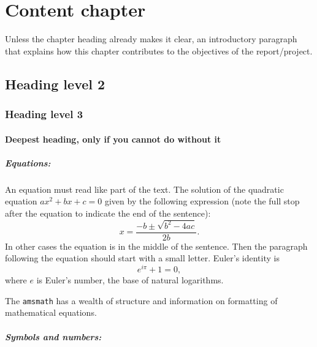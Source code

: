 \chapter{Content chapter}

Unless the chapter heading already makes it clear, an introductory paragraph that explains how this chapter contributes to the objectives of the report/project.

\section{Heading level 2}

\subsection{Heading level 3}

\subsubsection{Deepest heading, only if you cannot do without it}
\vspace{2cm}

\paragraph{Equations:}

An equation must read like part of the text. The solution of the quadratic equation $ax^2+bx+c=0$ given by the following expression (note the full stop after the equation to indicate the end of the sentence):
\begin{equation}
    x = \frac{-b \pm \sqrt{b^2-4ac}}{2b} .
\end{equation}
In other cases the equation is in the middle of the sentence. Then the paragraph following the equation should start with a small letter. Euler's identity is 
\begin{equation}
    e^{i \pi} + 1 = 0 ,
\end{equation}
where $e$ is Euler's number, the base of natural logarithms.

The \texttt{amsmath} has a wealth of structure and information on formatting of mathematical equations.

\pagebreak
\paragraph{Symbols and numbers:}

